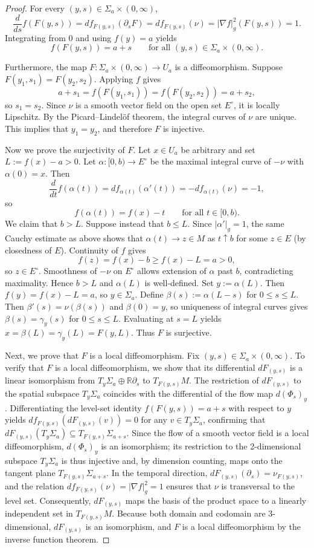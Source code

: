 \documentclass[12pt,oneside,a4paper]{article}
\theoremstyle{mytheorem}
\theoremstyle{remark}
\begin{document}
\begin{proof}
For every $(y,s)\in\Sigma_a\times(0,\infty)$,
\[
\frac{d}{ds}f(F(y,s))=df_{F(y,s)}(\partial_sF)=df_{F(y,s)}(\nu)=|\nabla f|_g^2(F(y,s))=1.
\]
Integrating from $0$ and using $f(y)=a$  yields
\[
f(F(y,s))=a+s\qquad\text{for all }(y,s)\in\Sigma_a\times(0,\infty).
\]

Furthermore, the map $F:\Sigma_a\times(0,\infty)\to U_a$ is a diffeomorphism.
 Suppose $F(y_1,s_1)=F(y_2,s_2)$. Applying $f$ gives
\[
a+s_1=f(F(y_1,s_1))=f(F(y_2,s_2))=a+s_2,
\]
so $s_1=s_2$.  Since $\nu$ is a smooth vector field on the open set $E^\circ$, it is locally Lipschitz. By the Picard--Lindelöf theorem, the integral curves of $\nu$ are unique. This implies that $y_1=y_2$, and therefore $F$ is injective.

Now we prove the surjectivity of \(F\). Let $x\in U_a$ be arbitrary and set $L:=f(x)-a>0$. Let $\alpha:[0,b)\to E^\circ$
be the maximal integral curve of $-\nu$ with $\alpha(0)=x$. Then
\[
\frac{d}{dt}f(\alpha(t))=df_{\alpha(t)}(\alpha'(t))=-df_{\alpha(t)}(\nu)=-1,
\]
so
\[
f(\alpha(t))=f(x)-t\qquad\text{for all }t\in[0,b).
\]
We claim that $b>L$. Suppose instead that $b\le L$. Since $|\alpha'|_g=1$, the same Cauchy estimate as above shows that $\alpha(t)\to z\in M$ as $t\uparrow b$ for some $z\in E$ (by closedness of $E$). Continuity of $f$ gives
\[
f(z)=f(x)-b\ge f(x)-L=a>0,
\]
so $z\in E^\circ$. Smoothness of $-\nu$ on $E^\circ$ allows extension of $\alpha$ past $b$, contradicting maximality. Hence $b>L$ and $\alpha(L)$ is well-defined. Set
$y:=\alpha(L).$ Then $f(y)=f(x)-L=a$, so $y\in\Sigma_a$. Define
$\beta(s):=\alpha(L-s)$ for $ 0\le s\le L.$
Then $\beta'(s)=\nu(\beta(s))$ and $\beta(0)=y$, so uniqueness of integral curves gives $\beta(s)=\gamma_y(s)$ for $0\le s\le L$. Evaluating at $s=L$ yields
$x=\beta(L)=\gamma_y(L)=F(y,L).$ Thus $F$ is surjective.

 Next, we prove that \(F\) is a local diffeomorphism. Fix $(y,s) \in \Sigma_a \times (0, \infty)$. To verify that $F$ is a local diffeomorphism, we show that its differential $dF_{(y,s)}$ is a linear isomorphism from $T_y\Sigma_a \oplus \mathbb{R}\partial_s$ to $T_{F(y,s)}M$. The restriction of $dF_{(y,s)}$ to the spatial subspace $T_y\Sigma_a$ coincides with the differential of the flow map $d(\Phi_s)_y$. Differentiating the level-set identity $f(F(y,s)) = a+s$ with respect to $y$ yields $df_{F(y,s)}(dF_{(y,s)}(v)) = 0$ for any $v \in T_y\Sigma_a$, confirming that $dF_{(y,s)}(T_y\Sigma_a) \subseteq T_{F(y,s)}\Sigma_{a+s}$. Since the flow of a smooth vector field is a local diffeomorphism, $d(\Phi_s)_y$ is an isomorphism; its restriction to the 2-dimensional subspace $T_y\Sigma_a$ is thus injective and, by dimension counting, maps onto the tangent plane $T_{F(y,s)}\Sigma_{a+s}$. In the temporal direction, $dF_{(y,s)}(\partial_s) = \nu_{F(y,s)}$, and the relation $df_{F(y,s)}(\nu) = |\nabla f|_g^2 = 1$ ensures that $\nu$ is transversal to the level set. Consequently, $dF_{(y,s)}$ maps the basis of the product space to a linearly independent set in $T_{F(y,s)}M$. Because both domain and codomain are 3-dimensional, $dF_{(y,s)}$ is an isomorphism, and $F$ is a local diffeomorphism by the inverse function theorem.


\end{proof}
\end{document}
